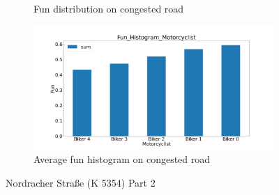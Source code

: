 \begin{figure}[H]
\begin{subfigure}[b]{0.45\textwidth}
        \caption{Fun distribution on congested road}
    \end{subfigure}
    \hfill
    \begin{subfigure}[b]{0.45\textwidth}
        \centering
        \includegraphics[width=1.0\textwidth]{images/Nordracher/Nordracher_Fun_Histogram_congested.png}
        \caption{Average fun histogram on congested road}
    \end{subfigure}
    \caption{Nordracher Straße (K 5354) Part 2}
\end{figure}


